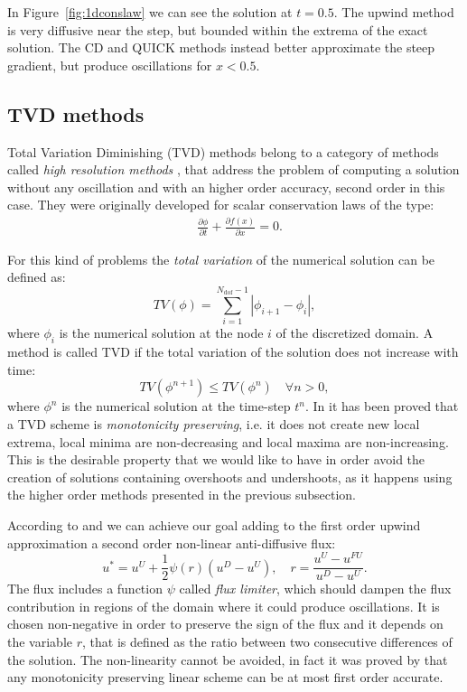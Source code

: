 In Figure~\ref{fig:1dconslaw} we can see the solution at $t=0.5$. The upwind 
method is very diffusive near the step, but bounded within the extrema of the 
exact solution. The CD and QUICK methods instead better approximate the steep 
gradient, but produce oscillations for $x<0.5$.
%
\subsection{TVD methods} \label{subsec:tvd}
Total Variation Diminishing (TVD) methods belong to a category of methods 
called \emph{high resolution methods} \cite{tvd:monotonicity}, that address the problem of computing a 
solution without any oscillation and with an higher order accuracy, second 
order in this case. They were originally developed for scalar conservation laws 
of the type:
\begin{align}
	\label{eq:conslaw} &\frac{\partial \phi}{\partial t} + \frac{\partial f(x) 
	}{\partial x} = 0. 
\end{align}

For this kind of problems the \emph{total variation} of the numerical solution 
can be defined as:
\begin{equation}
	TV(\phi) = \sum_{i=1}^{N_\text{dof}-1} |\phi_{i+1} - \phi_i|,
\end{equation}
where $\phi_i$ is the numerical solution at the node $i$ of the discretized 
domain. A method is called TVD if the total variation of the 
solution does not increase with time: 
\begin{equation}\label{eq:tvdcondition}
	TV(\phi ^{n+1}) \leq TV(\phi^n) \quad \forall n>0,
\end{equation}
where $\phi^n$ is the numerical solution at the time-step $t^n$. In 
\cite{tvd:monotonicity} it has been proved that a TVD scheme is 
\emph{monotonicity preserving}, i.e. it does not create new 
local extrema, local minima are non-decreasing and local maxima are 
non-increasing. This is the desirable property that we would like to have in 
order avoid the creation of solutions containing overshoots and undershoots, 
as it happens using the higher order methods presented in the previous 
subsection.

According to \cite{tvd:sweeby} and \cite{main:darwish} we can achieve our 
goal adding to the first order upwind approximation a second order 
non-linear 
anti-diffusive flux: 
\begin{equation} \label{eq:tvdformula}
u^* = u^U + \frac{1}{2}\psi(r)(u^D - u^U), \quad r = 
\frac{u^U - u^{FU}}{u^D - u^U}.
\end{equation}
The flux includes a function $\psi$ called \emph{flux limiter}, which 
should dampen the flux contribution in regions of the domain where it 
could produce oscillations. It is chosen non-negative in order to preserve the 
sign of the flux and it depends on the variable $r$, that is defined as the 
ratio between two consecutive differences of the solution. The non-linearity 
cannot be avoided, in fact it was proved by \textcite{tvd:godunov} that any 
monotonicity preserving linear scheme can be at most first order accurate.

